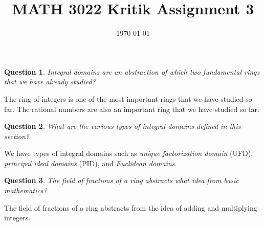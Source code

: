 \documentclass[11pt]{amsart}
\title{MATH 3022 Kritik Assignment 3}
\date{\today}
\newtheorem{question}{Question}
\begin{document}
\maketitle

\begin{question}
    Integral domains are an abstraction of which two fundamental rings that we have already studied?
\end{question}

The ring of integers is one of the most important rings that we have studied so far. The rational numbers are also an important ring that we have studied so far.

\begin{question}
    What are the various types of integral domains defined in this section?
\end{question}

We have types of integral domains such as \emph{unique factorization domain} (UFD), \emph{principal ideal domains} (PID), and \emph{Euclidean domains}.

\begin{question}
    The field of fractions of a ring abstracts what idea from basic mathematics?
\end{question}

The field of fractions of a ring abstracts from the idea of adding and multiplying integers.
\end{document}
